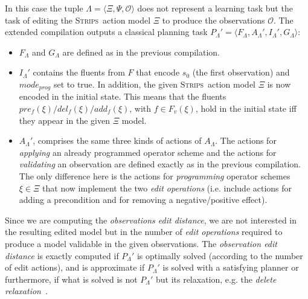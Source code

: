 \documentclass{article}
\newcommand{\tup}[1]{{\langle #1 \rangle}}
\newcommand{\strips}{\textsc{Strips}}     %
\begin{document}
In this case the tuple $\Lambda=\tup{\Xi,\Psi,\mathcal{O}}$ does not represent a learning task but the task of editing the \strips\ action model $\Xi$ to produce the observations $\mathcal{O}$. The extended compilation outputs a classical planning task $P_{\Lambda}'=\tup{F_{\Lambda},A_{\Lambda}',I_{\Lambda}',G_{\Lambda}}$:
\begin{itemize}
\item $F_{\Lambda}$ and $G_{\Lambda}$ are defined as in the previous compilation.
\item $I_{\Lambda}'$ contains the fluents from $F$ that encode $s_0$ (the first observation) and $mode_{prog}$ set to true. In addition, the given \strips\ action model $\Xi$ is now encoded in the initial state. This means that the fluents $pre_f(\xi)/del_f(\xi)/add_f(\xi)$, with $f\in F_v(\xi)$, hold in the initial state iff they appear in the given $\Xi$ model.
\item $A_{\Lambda}'$, comprises the same three kinds of actions of $A_{\Lambda}$. The actions for {\em applying} an already programmed operator scheme and the actions for {\em validating} an observation are defined exactly as in the previous compilation. The only difference here is the actions for {\em programming} operator schemes $\xi\in\Xi$ that now implement the two {\em edit operations} (i.e. include actions for adding a precondition and for removing a negative/positive effect).  
\end{itemize}

Since we are computing the {\em observations edit distance}, we are not interested in the resulting edited model but in the number of {\em edit operations} required to produce a model validable in the given observations. The {\em observation edit distance} is exactly computed if $P_{\Lambda}'$ is optimally solved (according to the number of edit actions), and is approximate if $P_{\Lambda}'$ is solved with a satisfying planner or furthermore, if what is solved is not $P_{\Lambda}'$ but its relaxation, e.g. the {\em delete relaxation}~\cite{bonet2001planning}.
\end{document}
